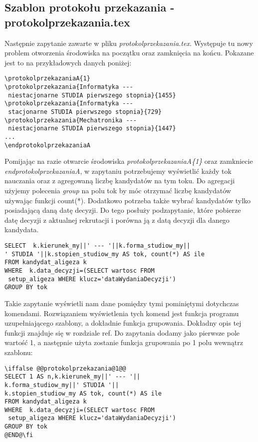 \subsection*{Szablon protokołu przekazania -  protokolprzekazania.tex}
Następnie zapytanie zawarte w pliku \emph{protokolprzekazania.tex}. Występuje tu nowy problem otworzenia środowiska na początku oraz zamknięcia na końcu. Pokazane jest to na przykładowych danych poniżej:
 \begin{lstlisting}
\protokolprzekazaniaA{1}
\protokolprzekazania{Informatyka ---
 niestacjonarne STUDIA pierwszego stopnia}{1455}
\protokolprzekazania{Informatyka ---
 stacjonarne STUDIA pierwszego stopnia}{729}
\protokolprzekazania{Mechatronika ---
 niestacjonarne STUDIA pierwszego stopnia}{1447}
...
\endprotokolprzekazaniaA        
\end{lstlisting}
Pomijając na razie otwarcie środowiska \emph{protokolprzekazaniaA\{1\} }oraz zamkniecie \emph{endprotokolprzekazaniaA}, w zapytaniu potrzebujemy wyświetlić każdy tok nauczania oraz z agregowaną liczbę kandydatów na tym toku. Do agregacji użyjemy polecenia \emph{group}  na polu tok by móc otrzymać liczbę kandydatów używając funkcji count(*). Dodatkowo potrzeba także wybrać kandydatów tylko posiadającą daną datę decyzji. Do tego posłuży podzapytanie, które pobierze datę decyzji z aktualnej rekrutacji i porówna ją z datą decyzji dla danego kandydata. 
 \begin{lstlisting}
SELECT  k.kierunek_my||' --- '||k.forma_studiow_my||
' STUDIA '||k.stopien_studiow_my AS tok, count(*) AS ile
FROM kandydat_aligeza k
WHERE  k.data_decyzji=(SELECT wartosc FROM
 setup_aligeza WHERE klucz='dataWydaniaDecyzji') 
GROUP BY tok
\end{lstlisting}
Takie zapytanie wyświetli nam dane pomiędzy tymi pominiętymi dotychczas komendami. 
Rozwiązaniem wyświetlenia tych komend jest funkcja programu uzupełniającego szablony, a dokładnie funkcja grupowania. Dokładny opis tej funkcji znajduje się w rozdziale ref. Do zapytania dodamy jako pierwsze pole wartość 1, a następnie użyta zostanie funkcja grupowania po 1 polu wewnątrz szablonu:
 \begin{lstlisting}
\iffalse @@protokolprzekazania@1@@
SELECT 1 AS n,k.kierunek_my||' --- '||
k.forma_studiow_my||' STUDIA '||
k.stopien_studiow_my AS tok, count(*) AS ile
FROM kandydat_aligeza k
WHERE  k.data_decyzji=(SELECT wartosc FROM
 setup_aligeza WHERE klucz='dataWydaniaDecyzji') 
GROUP BY tok
@END@\fi
\end{lstlisting}


